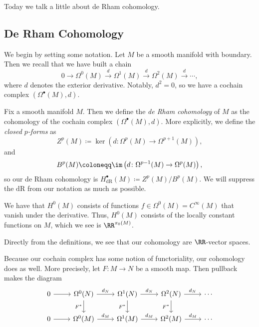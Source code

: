 \documentclass[../notes.tex]{subfiles}
\begin{document}
Today we talk a little about de Rham cohomology.

\subsection{De Rham Cohomology}
We begin by setting some notation. Let $M$ be a smooth manifold with boundary. Then we recall that we have built a chain
\[0\to\Omega^0(M)\stackrel d\to\Omega^1(M)\stackrel d\to\Omega^2(M)\stackrel d\to\cdots,\]
where $d$ denotes the exterior derivative. Notably, $d^2=0$, so we have a cochain complex $(\Omega^\bullet(M),d)$.
\begin{definition}
	Fix a smooth manifold $M$. Then we define the \textit{de Rham cohomology} of $M$ as the cohomology of the cochain complex $(\Omega^\bullet(M),d)$. More explicitly, we define the \textit{closed $p$-forms} as
	\[Z^p(M)\coloneqq\ker\left(d\colon\Omega^p(M)\to\Omega^{p+1}(M)\right),\]
	and
	\[B^p(M)\coloneqq\im\left(d\colon\Omega^{p-1}(M)\to\Omega^p(M)\right),\]
	so our de Rham cohomology is $H^\bullet_{\mathrm{dR}}(M)\coloneqq Z^p(M)/B^p(M)$. We will suppress the $\mathrm{dR}$ from our notation as much as possible.
\end{definition}
\begin{example}
	We have that $H^0(M)$ consists of functions $f\in\Omega^0(M)=C^\infty(M)$ that vanish under the derivative. Thus, $H^0(M)$ consists of the locally constant functions on $M$, which we see is $\RR^{\pi_0(M)}$.
\end{example}
\begin{remark}
	Directly from the definitions, we see that our cohomology are $\RR$-vector spaces.
\end{remark}
Because our cochain complex has some notion of functoriality, our cohomology does as well. More precisely, let $F\colon M\to N$ be a smooth map. Then pullback makes the diagram
\[\begin{tikzcd}
	0 & {\Omega^0(N)} & {\Omega^1(N)} & {\Omega^2(N)} & \cdots \\
	0 & {\Omega^0(M)} & {\Omega^1(M)} & {\Omega^2(M)} & \cdots
	\arrow[from=1-1, to=1-2]
	\arrow["{d_N}", from=1-2, to=1-3]
	\arrow["{F^*}"', from=1-2, to=2-2]
	\arrow["{d_N}", from=1-3, to=1-4]
	\arrow["{F^*}"', from=1-3, to=2-3]
	\arrow["{d_N}", from=1-4, to=1-5]
	\arrow["{F^*}"', from=1-4, to=2-4]
	\arrow[from=2-1, to=2-2]
	\arrow["{d_M}", from=2-2, to=2-3]
	\arrow["{d_M}", from=2-3, to=2-4]
	\arrow["{d_M}", from=2-4, to=2-5]
\end{tikzcd}\]
\end{document}
